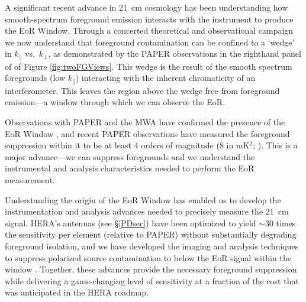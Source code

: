 \documentclass[preprint]{aastex}
\def\kperp{k_{\bot}}
\def\kpar{k_{\|}}
\begin{document}
A significant recent advance in 21~cm cosmology has been understanding how smooth-spectrum
foreground emission interacts with the instrument to produce the EoR Window.
Through a concerted theoretical and observational campaign
\citep{morales_et_al2012,parsons_et_al2012b,vedantham_2012,Datta_2010,hazelton_et_al2013,pober_et_al2013,parsons_et_al2013,dillon_et_al2013b_trunc}
we now understand that foreground contamination can be confined to a `wedge' in
$\kpar$ vs.\ $\kperp$, as demonstrated by the PAPER observations in the
righthand panel of of Figure \ref{fig:twoFGViews}. This wedge is the result of
the smooth spectrum foregrounds (low $\kpar$) interacting with the inherent
chromaticity of an interferometer. 
This leaves the region above the wedge free from 
foreground emission---a window through which we can observe the EoR.

Observations with PAPER and the MWA have confirmed the presence of the EoR Window
\citep{pober_et_al2013,dillon_et_al2013b_trunc}, and recent PAPER observations
have measured the foreground suppression within it
to be at least 4 orders of magnitude (8 in mK$^2$;
\citealt{parsons_et_al2013}).
This is a major advance---we can
suppress foregrounds and we understand the instrumental and analysis
characteristics needed to perform the EoR measurement.

Understanding the origin of the EoR Window has enabled us to develop the
instrumentation and analysis advances needed to precisely measure the 21~cm
signal. HERA's antennas (see \S \ref{PDsec}) have been optimized 
to yield $\sim$30
times the sensitivity per element (relative to PAPER) without substantially degrading
foreground isolation,
and we have developed the imaging and
analysis techniques to suppress polarized source contamination to below the EoR
signal within the window \citep{bernardi_2013_trunc,moore_et_al2013}.
Together, these advances provide the necessary foreground suppression
while delivering a game-changing level of sensitivity at a fraction of the
cost that was anticipated in the HERA roadmap.
\end{document}

